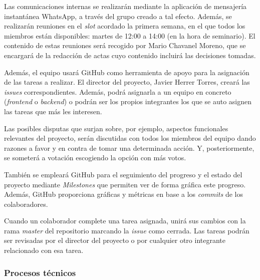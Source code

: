 \documentclass{article}
\begin{document}




Las comunicaciones internas se realizarán mediante la aplicación de mensajería instantánea WhatsApp, a través del grupo creado a tal efecto. Además, se realizarán reuniones en el \textit{slot} acordado la primera semana, en el que todos los miembros están disponibles: martes de 12:00 a 14:00 (en la hora de seminario). El contenido de estas reuniones será recogido por Mario Chavanel Moreno, que se encargará de la redacción de actas cuyo contenido incluirá las decisiones tomadas.

Además, el equipo usará GitHub como herramienta de apoyo para la asignación de las tareas a realizar. El director del proyecto, Javier Herrer Torres, creará las \textit{issues} correspondientes. Además, podrá asignarla a un equipo en concreto (\textit{frontend} o \textit{backend}) o podrán ser los propios integrantes los que se auto asignen las tareas que más les interesen.

Las posibles disputas que surjan sobre, por ejemplo, aspectos funcionales relevantes del proyecto, serán discutidas con todos los miembros del equipo dando razones a favor y en contra de tomar una determinada acción. Y, posteriormente, se someterá a votación escogiendo la opción con más votos.

También se empleará GitHub para el seguimiento del progreso y el estado del proyecto mediante \textit{Milestones} que permiten ver de forma gráfica este progreso. Además, GitHub proporciona gráficas y métricas en base a los \textit{commits} de los colaboradores.

Cuando un colaborador complete una tarea asignada, unirá sus cambios con la rama \textit{master} del repositorio marcando la \textit{issue} como cerrada. Las tareas podrán ser revisadas por el director del proyecto o por cualquier otro integrante relacionado con esa tarea.

\subsubsection{Procesos técnicos}
\end{document}
